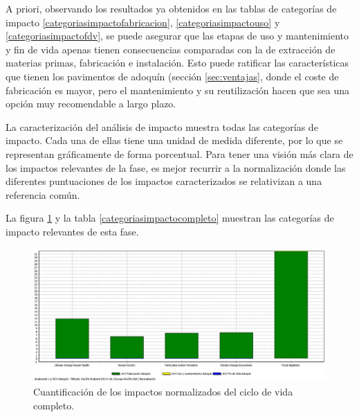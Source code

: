 A priori, observando los resultados ya obtenidos en las tablas de categorías de impacto \ref{categoriasimpactofabricacion}, \ref{categoriasimpactouso} y \ref{categoriasimpactofdv}, se puede asegurar que las etapas de uso y mantenimiento y fin de vida apenas tienen consecuencias comparadas con la de extracción de materias primas, fabricación e instalación. Esto puede ratificar las características que tienen los pavimentos de adoquín (sección \ref{sec:ventajas}, donde el coste de fabricación es mayor, pero el mantenimiento y su reutilización hacen que sea una opción muy recomendable a largo plazo.




La caracterización del análisis de impacto muestra todas las categorías de impacto. Cada una de ellas tiene una unidad de medida diferente, por lo que se representan gráficamente de forma porcentual. Para tener una visión más clara de los impactos relevantes de la fase, es mejor recurrir a la normalización donde las diferentes puntuaciones de los impactos caracterizados se relativizan a una referencia común.

La figura \ref{fig:completo_normalizacion} y la tabla \ref{categoriasimpactocompleto} muestran las categorías de impacto relevantes de esta fase.

\begin{figure}[!htb]
\centering
\includegraphics[width=15cm]{img/completo_normalizacion.png}
\caption{Cuantificación de los impactos normalizados del ciclo de vida completo.}
\label{fig:completo_normalizacion}
\end{figure}

